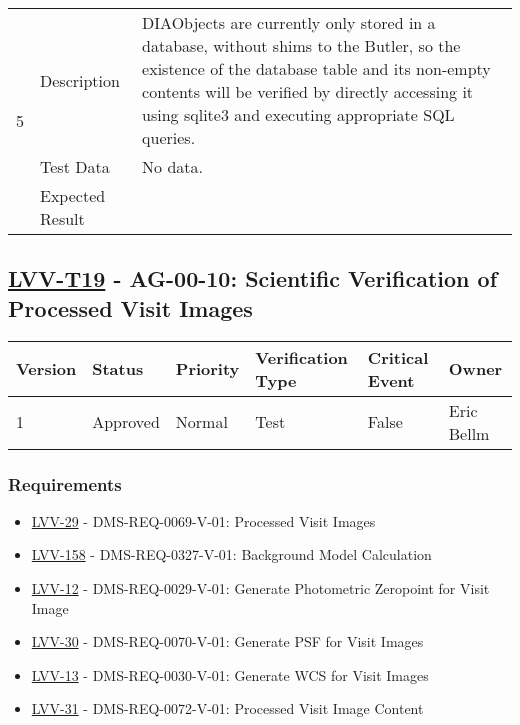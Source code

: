 \begin{longtable}[]{p{1.3cm}p{2cm}p{13cm}}
            \multirow{3}{*}{ 5 } & Description &
            \begin{minipage}[t]{13cm}{\footnotesize
            DIAObjects are currently only stored in a database, without shims to the
Butler, so the existence of the database table and its non-empty
contents will be verified by directly accessing it using sqlite3 and
executing appropriate SQL queries.

            \vspace{\dp0}
            } \end{minipage} \\ \cline{2-3}
            & Test Data &
            \begin{minipage}[t]{13cm}{\footnotesize
                No data.
                \vspace{\dp0}
            } \end{minipage} \\ \cline{2-3}
            & Expected Result &
        \\ \midrule
    \end{longtable}

\subsection{\href{https://jira.lsstcorp.org/secure/Tests.jspa\#/testCase/LVV-T19}{LVV-T19}
    - AG-00-10: Scientific Verification of Processed Visit Images}\label{lvv-t19}

\begin{longtable}[]{llllll}
\toprule
Version & Status & Priority & Verification Type & Critical Event & Owner
\\\midrule
1 & Approved & Normal &
Test & False & Eric Bellm
\\\bottomrule
\end{longtable}

\subsubsection{Requirements}
\begin{itemize}
\item \href{https://jira.lsstcorp.org/browse/LVV-29}{LVV-29} - DMS-REQ-0069-V-01: Processed Visit Images
\item \href{https://jira.lsstcorp.org/browse/LVV-158}{LVV-158} - DMS-REQ-0327-V-01: Background Model Calculation
\item \href{https://jira.lsstcorp.org/browse/LVV-12}{LVV-12} - DMS-REQ-0029-V-01: Generate Photometric Zeropoint for Visit Image
\item \href{https://jira.lsstcorp.org/browse/LVV-30}{LVV-30} - DMS-REQ-0070-V-01: Generate PSF for Visit Images
\item \href{https://jira.lsstcorp.org/browse/LVV-13}{LVV-13} - DMS-REQ-0030-V-01: Generate WCS for Visit Images
\item \href{https://jira.lsstcorp.org/browse/LVV-31}{LVV-31} - DMS-REQ-0072-V-01: Processed Visit Image Content
\end{itemize}

